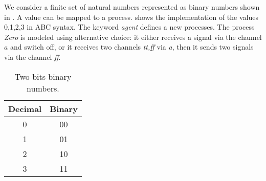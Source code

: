 We consider a finite set of natural numbers represented as binary numbers shown in . A value can be mapped to a \picalc{} process.  shows the \picalc{} implementation of the values 0,1,2,3 in ABC syntax. The keyword \textit{agent} defines a new processes. The process \textit{Zero} is modeled using alternative choice: it either receives a signal via the channel $a$ and switch off, or it receives two channels \textit{tt,ff} via \textit{a}, then it sends two signals via the channel \textit{ff}.
\begin{table}[H]
\centering
\begin{tabular}{|c|c|}
\hline
Decimal & Binary \\ \hline
0       & 00     \\ \hline
1       & 01     \\ \hline
2       & 10     \\ \hline
3       & 11     \\ \hline
\end{tabular}%
\caption{Two bits binary numbers.}
\label{two_bit_binary_numbers}
\end{table}

